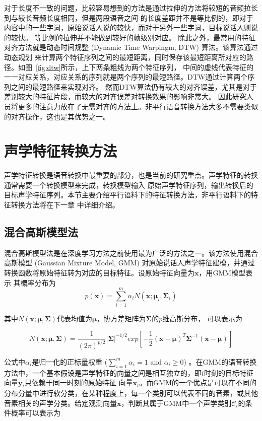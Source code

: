 对于长度不一致的问题，比较容易想到的方法是通过拉伸的方法将较短的音频拉长到与较长音频长度相同，但是两段语音之间
的长度差距并不是等比例的，即对于内容中的一些字词，原始说话人说的较快，而对于另外一些字词，目标说话人则说的较快。
等比例的拉伸并不能做到较好的帧级别对应。
除此之外，最常用的特征对齐方法就是动态时间规整 (Dynamic Time Warpingm, DTW) 算法。该算法通过动态规划
来计算两个特征序列之间的最短距离，同时保存该最短距离所对应的路径。如图~\ref{fig:dtw}所示，上下两条粗线为两个特征序列，
中间的虚线代表特征的一一对应关系，对应关系的序列就是两个序列的最短路径。DTW通过计算两个序列之间的最短路径来实现对齐。
然而DTW算法仍有较大的对齐误差，尤其是对于差别较大的特征片段，而较大的对齐误差对转换效果的影响非常大。
因此研究人员将更多的注意力放在了无需对齐的方法上。非平行语音转换方法大多不需要类似的对齐操作，这也是其优势之一。

\section{声学特征转换方法}
声学特征转换是语音转换中最重要的部分，也是当前的研究重点。声学特征的转换通常需要一个转换模型来完成，转换模型输入
原始声学特征序列，输出转换后的目标声学特征序列。本节主要介绍平行语料下的特征转换方法，非平行语料下的特征转换方法将在下一章
中详细介绍。

\subsection{混合高斯模型法}
混合高斯模型法是在深度学习方法之前使用最为广泛的方法之一。该方法使用混合高斯模型 (Gaussian Mixture Model, GMM) 
对原始说话人声学特征建模，并通过转换函数将原始特征转为对应的目标特征。设原始特征向量为$\mathbf{x}$，用GMM模型表示
其概率分布为
\begin{equation}
    \label{eq:gmm}
    p(\mathbf{x})=\sum^{m}_{i=1}\alpha_iN(\mathbf{x};\bm{\mu}_i,\bm{\Sigma}_i)
\end{equation}

其中$N(\mathbf{x};\bm{\mu},\bm{\Sigma})$代表均值为$\bm{\mu}$，协方差矩阵为$\bm{\Sigma}$的$p$维高斯分布，
可以表示为

\begin{equation}
    N(\mathbf{x};\bm{\mu},\bm{\Sigma})=\frac{1}{(2\pi)^{p/2}}\left| \bm{\Sigma} \right|^{-1/2} exp\left[ -\frac{1}{2}(\mathbf{x}-\bm{\mu})^{T}\bm{\Sigma}^{-1}(\mathbf{x}-\bm{\mu}) \right]
\end{equation}

公式中$\alpha_i$是归一化的正标量权重 ($\sum^{m}_{i=1}\alpha_i=1$ and $\alpha_i \ge 0$) 。在GMM的语音转换
方法中，一个基本假设是声学特征的向量之间是相互独立的，即$t$时刻的目标特征向量$\mathbf{y}_t$只依赖于同一时刻的原始特征
向量$\mathbf{x}_t$。而GMM的一个优点是可以在不同的分布分量中进行软分类，在某种程度上，每一个类别可以代表不同的音素，或其他
音素相关的声学分类。给定观测向量$\mathbf{x}$，判断其属于GMM中一个声学类别$\mathcal{C}_i$的条件概率可以表示为

